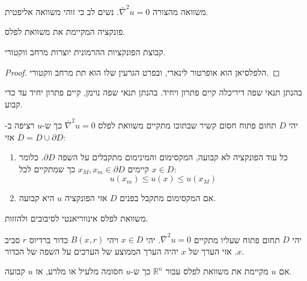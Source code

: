 \documentclass{tstextbook}
\begin{document}
\begin{definition}
משוואה מהצורה \(\bar{\nabla}^2u=0\). נשים לב כי זוהי משוואה אליפטית.

\end{definition}
\begin{definition}
פונקציה המקיימת את משוואת לפלס.

\end{definition}
\begin{proposition}
קבוצת הפונקציות ההרמונית יוצרות מרחב ווקטורי.

\end{proposition}
\begin{proof}
הלפלסיאן הוא אופרטור לינארי, ובפרט הגרעין שלו הוא תת מרחב ווקטורי.

\end{proof}
\begin{proposition}
בהנתן תנאי שפה דיריכלה קיים פתרון ויחיד. בהנתן תנאי שפה נוימן, קיים פתרון יחיד עד כדי קבוע.

\end{proposition}
\begin{proposition}
יהי \(D\) תחום פתוח חסום קשיר שבתוכו מתקיים משוואת לפלס \(\bar{\nabla}^2u=0\) כך ש-\(u\) רציפה ב-\(\overline{D}=D\cup \partial D\) אזי:

  \begin{enumerate}
    \item כל עוד הפונקציה לא קבועה, המקסימום והמינימום מתקבלים על השפה \(\partial D\). כלומר קיימים \(x_{M},x_{m}\in \partial D\) כך שמתקיים לכל \(x \in D\): 
$$u(x_{m})\leq u(x)\leq u(x_{M})$$


    \item אם המקסימום מתקבל בפנים \(D\) אזי הפונקציה \(u\) היא קבועה. 


  \end{enumerate}
\end{proposition}
\begin{proposition}
משוואת לפלס אינווריאנטי לסיבובים ולהזזות.

\end{proposition}
\begin{proposition}
יהי \(D\) תחום פתוח שעליו מתקיים \(\bar{\nabla}^2u=0\). יהי \(x \in D\) ויהי \(B(x,r)\) כדור ברדיוס \(r\) סביב \(x\). אזי הערך של \(x\) יהיה הערך הממוצע של הערכים על השפה של הכדור.

\end{proposition}
\begin{theorem}[ליוביל]
אם \(u\) מקיימת את משוואת לפלס עבור \(\mathbb{R}^{n}\) כך ש-\(u\) חסומה מלעיל או מלרע, אז \(u\) קבועה.

\end{theorem}
\end{document}
